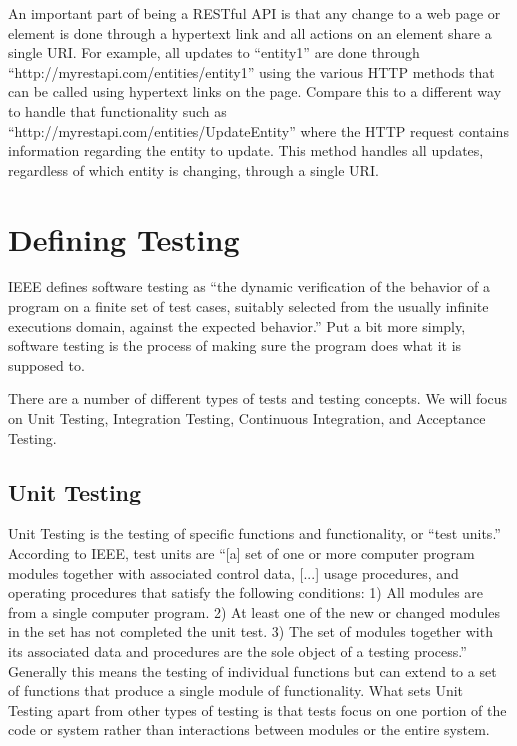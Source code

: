 \documentclass[12pt]{ucthesis}
\begin{document}
An important part of being a RESTful API is that any change to a web page or element is done through a hypertext link and all actions on an element share a single URI. For example, all updates to ``entity1'' are done through ``http://myrestapi.com/entities/entity1'' using the various HTTP methods that can be called using hypertext links on the page. Compare this to a different way to handle that functionality such as ``http://myrestapi.com/entities/UpdateEntity'' where the HTTP request contains information regarding the entity to update. This method handles all updates, regardless of which entity is changing, through a single URI.

\section{Defining Testing}
IEEE defines software testing as ``the dynamic verification of the behavior of a program on a finite set of test cases, suitably selected from the usually infinite executions domain, against the expected behavior.''\cite{TestingDefinition} Put a bit more simply, software testing is the process of making sure the program does what it is supposed to.

There are a number of different types of tests and testing concepts. We will focus on Unit Testing, Integration Testing, Continuous Integration, and Acceptance Testing.

\subsection{Unit Testing}
Unit Testing is the testing of specific functions and functionality, or ``test units.'' According to IEEE, test units are ``[a] set of one or more computer program modules together with associated control data, [...] usage procedures, and operating procedures that satisfy the following conditions: 1) All modules are from a single computer program. 2) At least one of the new or changed modules in the set has not completed the unit test. 3) The set of modules together with its associated data and procedures are the sole object of a testing process.''\cite{UnitTestDefinition} Generally this means the testing of individual functions but can extend to a set of functions that produce a single module of functionality. What sets Unit Testing apart from other types of testing is that tests focus on one portion of the code or system rather than interactions between modules or the entire system.
\end{document}
